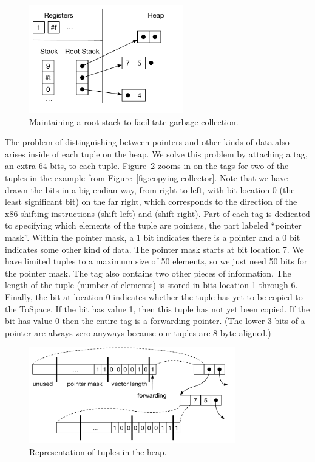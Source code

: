 \documentclass[11pt]{book}
\begin{document}
\begin{figure}[tbp]
\centering \includegraphics[width=0.60\textwidth]{figs/root-stack}
\caption{Maintaining a root stack to facilitate garbage collection.}
\label{fig:shadow-stack}
\end{figure}

The problem of distinguishing between pointers and other kinds of data
also arises inside of each tuple on the heap. We solve this problem by
attaching a tag, an extra 64-bits, to each
tuple. Figure~\ref{fig:tuple-rep} zooms in on the tags for two of the
tuples in the example from Figure~\ref{fig:copying-collector}. Note
that we have drawn the bits in a big-endian way, from right-to-left,
with bit location 0 (the least significant bit) on the far right,
which corresponds to the direction of the x86 shifting instructions
 (shift left) and  (shift right). Part of each tag
is dedicated to specifying which elements of the tuple are pointers,
the part labeled ``pointer mask''. Within the pointer mask, a 1 bit
indicates there is a pointer and a 0 bit indicates some other kind of
data. The pointer mask starts at bit location 7. We have limited
tuples to a maximum size of 50 elements, so we just need 50 bits for
the pointer mask. The tag also contains two other pieces of
information. The length of the tuple (number of elements) is stored in
bits location 1 through 6. Finally, the bit at location 0 indicates
whether the tuple has yet to be copied to the ToSpace.  If the bit has
value 1, then this tuple has not yet been copied.  If the bit has
value 0 then the entire tag is a forwarding pointer. (The lower 3 bits
of a pointer are always zero anyways because our tuples are 8-byte
aligned.)

\begin{figure}[tbp]
\centering \includegraphics[width=0.8\textwidth]{figs/tuple-rep}
\caption{Representation of tuples in the heap.}
\label{fig:tuple-rep}
\end{figure}
\end{document}
